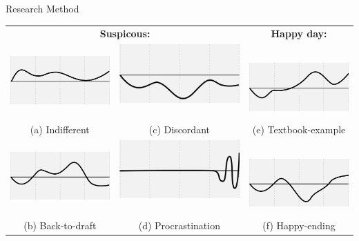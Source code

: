 \documentclass[final]{beamer} %
\newcommand{\marker}[1]{\textbf{\color{knaccentcolor1} #1}}
\begin{document}
\begin{frame}{}
\begin{columns}[t]
\begin{column}{.45\linewidth}
\begin{block}{Research Method}
\begin{center}
\begin{tabular}{cc|c}
\multicolumn{2}{c|}{\marker{Suspicous:}} & \marker{Happy day:}\tabularnewline
\includegraphics[width=0.3\columnwidth]{img/pattern-indifferent} &
\includegraphics[width=0.3\columnwidth]{img/pattern-discordant} ~ ~&
~ \includegraphics[width=0.3\columnwidth]{img/pattern-textbook-example}\tabularnewline
(a) Indifferent & (c) Discordant & (e) Textbook-example \tabularnewline
\includegraphics[width=0.3\columnwidth]{img/pattern-back-to-draft} &
\includegraphics[width=0.3\columnwidth]{img/pattern-procrastination} ~ ~ & 
~ \includegraphics[width=0.3\columnwidth]{img/pattern-happy-ending}
\tabularnewline
(b) Back-to-draft & (d) Procrastination & (f) Happy-ending
\end{tabular}
\end{center}

\vspace{2\columnsep}


\end{block}
    

\end{column}
\end{columns}
\end{frame}
\end{document}
